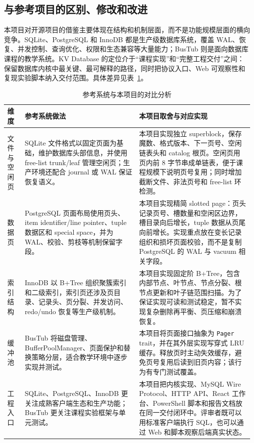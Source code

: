 \documentclass[UTF8,a4paper,12pt]{ctexart}
\newcommand{\code}[1]{\texttt{#1}}
\begin{document}
\subsection{与参考项目的区别、修改和改进}

本项目对开源项目的借鉴主要体现在结构和机制层面，而不是功能规模层面的横向竞争。SQLite、PostgreSQL 和 InnoDB 都是生产级数据库系统，覆盖 WAL、恢复、并发控制、查询优化、权限和生态兼容等大量能力；BusTub 则是面向数据库课程的教学系统。KV Database 的定位介于“课程实现”和“完整工程交付”之间：保留数据库内核中最关键、最可解释的路径，同时把协议入口、Web 可观察性和复现实验脚本纳入交付范围。具体差异见表~\ref{tab:opensource-compare}。

\begin{table}[H]
\centering
\caption{参考系统与本项目的对比分析}
\label{tab:opensource-compare}
\small
\begin{tabularx}{\textwidth}{p{2.3cm}p{4.25cm}X}
\toprule
维度 & 参考系统做法 & 本项目取舍与对应实现\\
\midrule
文件与空闲页 & SQLite 文件格式以固定页面为基础，维护数据库头部信息，并使用 free-list trunk/leaf 管理空闲页；生产环境还配合 journal 或 WAL 保证恢复语义。 & 本项目实现独立 superblock，保存魔数、格式版本、下一页号、空闲链表头和 catalog 根页。空闲页用页内前 8 字节串成单链表，便于课程规模下说明页号复用；同时增加截断文件、非法页号和 free-list 环检测。\\
数据页 & PostgreSQL 页面布局使用页头、item identifier/line pointer、tuple 数据区和 special space，并为 WAL、校验、剪枝等机制保留字段。 & 本项目实现精简 slotted page：页头记录页号、槽数量和空闲区边界，槽目录向后增长，tuple 数据从页尾向前增长。实现重点放在变长记录组织和损坏页面校验，而不是复制 PostgreSQL 的 WAL 与 vacuum 相关字段。\\
索引结构 & InnoDB 以 B+Tree 组织聚簇索引和二级索引，索引页还涉及页目录、记录头、页分裂、并发访问、redo/undo 恢复等生产级机制。 & 本项目实现固定阶 B+Tree，包含内部节点、叶节点、节点分裂、根节点更新和叶子链范围扫描。为了保证实现可读和测试稳定，暂不实现复杂删除再平衡、页压缩和崩溃恢复。\\
缓冲池 & BusTub 将磁盘管理、BufferPoolManager、页面保护和替换策略分层，适合教学环境中逐步实现并测试。 & 本项目将页面接口抽象为 \code{Pager} trait，并在其外层实现写穿式 LRU 缓存。释放页时主动失效缓存，避免页号复用后读到旧页内容；该行为有专门测试覆盖。\\
工程入口 & SQLite、PostgreSQL、InnoDB 更关注成熟客户端生态和生产功能；BusTub 更关注课程实验框架与单元测试。 & 本项目把内核实现、MySQL Wire Protocol、HTTP API、React 工作台、PowerShell 脚本和报告文档放在同一交付闭环中。评审者既可以用标准客户端执行 SQL，也可以通过 Web 和脚本观察后端真实状态。\\
\bottomrule
\end{tabularx}
\normalsize
\end{table}
\end{document}
